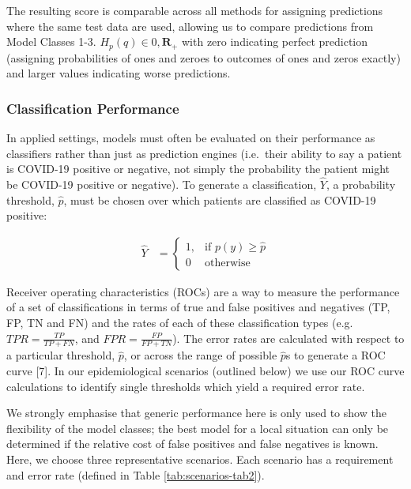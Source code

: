 \documentclass[]{elsarticle} %
\begin{document}
The resulting score is comparable across all methods for assigning predictions where the same test data are used, allowing us to compare predictions from Model Classes 1-3.
\(H_p(q)\in {0,\boldsymbol{R}_+}\) with zero indicating perfect prediction (assigning probabilities of ones and zeroes to outcomes of ones and zeros exactly) and larger values indicating worse predictions.

\hypertarget{classification-performance}{%
\subsubsection{Classification Performance}\label{classification-performance}}

In applied settings, models must often be evaluated on their performance as classifiers rather than just as prediction engines (i.e.~their ability to say a patient is COVID-19 positive or negative, not simply the probability the patient might be COVID-19 positive or negative).
To generate a classification, \(\hat{Y}\), a probability threshold, \(\hat{p}\), must be chosen over which patients are classified as COVID-19 positive:

\begin{equation}\begin{aligned}
\hat{Y} &= \begin{cases}
    1,& \text{if } p(y) \geq \hat{p} \\
     0  & \text{otherwise}
\end{cases}
\label{eq:ClassificationThreshold}
\end{aligned}\end{equation}\ignorespacesafterend

Receiver operating characteristics (ROCs) are a way to measure the performance of a set of classifications in terms of true and false positives and negatives (TP, FP, TN and FN) and the rates of each of these classification types (e.g.~\(TPR = \frac{TP}{TP+FN}\), and \(FPR = \frac{FP}{FP+TN}\)).
The error rates are calculated with respect to a particular threshold, \(\hat{p}\), or across the range of possible \(\hat{p}\)s to generate a ROC curve {[}7{]}.
In our epidemiological scenarios (outlined below) we use our ROC curve calculations to identify single thresholds which yield a required error rate.

We strongly emphasise that generic performance here is only used to show the flexibility of the model classes; the best model for a local situation can only be determined if the relative cost of false positives and false negatives is known.
Here, we choose three representative scenarios.
Each scenario has a requirement and error rate (defined in Table \ref{tab:scenarios-tab2}).
\end{document}
